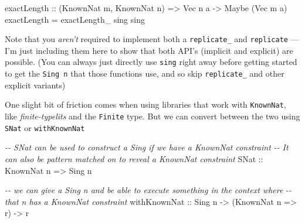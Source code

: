 \documentclass[]{article}
\newenvironment{Shaded}{}{}
\newcommand{\CommentTok}[1]{\textcolor[rgb]{0.38,0.63,0.69}{\textit{#1}}}
\newcommand{\DataTypeTok}[1]{\textcolor[rgb]{0.56,0.13,0.00}{#1}}
\newcommand{\NormalTok}[1]{#1}
\newcommand{\OtherTok}[1]{\textcolor[rgb]{0.00,0.44,0.13}{#1}}
\begin{document}
\begin{Shaded}
\begin{Highlighting}[]
\OtherTok{exactLength ::}\NormalTok{ (}\DataTypeTok{KnownNat}\NormalTok{ m, }\DataTypeTok{KnownNat}\NormalTok{ n) }\OtherTok{=>} \DataTypeTok{Vec}\NormalTok{ n a }\OtherTok{{-}>} \DataTypeTok{Maybe}\NormalTok{ (}\DataTypeTok{Vec}\NormalTok{ m a)}
\NormalTok{exactLength }\OtherTok{=}\NormalTok{ exactLength\_ sing sing}
\end{Highlighting}
\end{Shaded}

Note that you \emph{aren't} required to implement both a \texttt{replicate\_}
and \texttt{replicate} --- I'm just including them here to show that both API's
(implicit and explicit) are possible. (You can always just directly use
\texttt{sing} right away before getting started to get the \texttt{Sing\ n} that
those functions use, and so skip \texttt{replicate\_} and other explicit
variants)

One slight bit of friction comes when using libraries that work with
\texttt{KnownNat}, like \emph{finite-typelits} and the \texttt{Finite} type. But
we can convert between the two using \texttt{SNat} or \texttt{withKnownNat}

\begin{Shaded}
\begin{Highlighting}[]
\CommentTok{{-}{-} SNat can be used to construct a \textasciigrave{}Sing\textasciigrave{} if we have a \textasciigrave{}KnownNat\textasciigrave{} constraint}
\CommentTok{{-}{-} It can also be pattern matched on to reveal a \textasciigrave{}KnownNat constraint\textasciigrave{}}
\DataTypeTok{SNat}\OtherTok{ ::} \DataTypeTok{KnownNat}\NormalTok{ n }\OtherTok{=>} \DataTypeTok{Sing}\NormalTok{ n}

\CommentTok{{-}{-} we can give a \textasciigrave{}Sing n\textasciigrave{} and be able to execute something in the context where}
\CommentTok{{-}{-} that \textasciigrave{}n\textasciigrave{} has a \textasciigrave{}KnownNat\textasciigrave{} constraint}
\OtherTok{withKnownNat ::} \DataTypeTok{Sing}\NormalTok{ n }\OtherTok{{-}>}\NormalTok{ (}\DataTypeTok{KnownNat}\NormalTok{ n }\OtherTok{=>}\NormalTok{ r) }\OtherTok{{-}>}\NormalTok{ r}
\end{Highlighting}
\end{Shaded}
\end{document}
